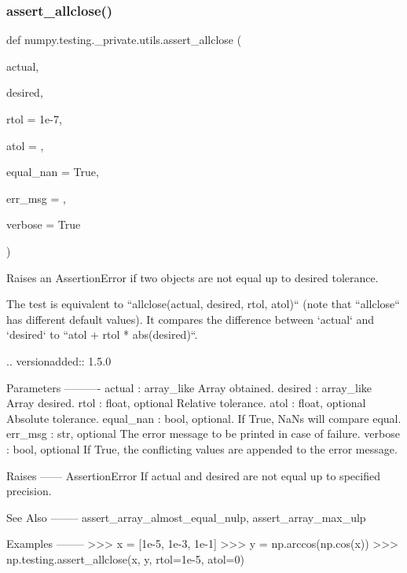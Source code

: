 \subsubsection{\texorpdfstring{assert\+\_\+allclose()}{assert\_allclose()}}
{\footnotesize\ttfamily def numpy.\+testing.\+\_\+private.\+utils.\+assert\+\_\+allclose (\begin{DoxyParamCaption}\item[{}]{actual,  }\item[{}]{desired,  }\item[{}]{rtol = {\ttfamily 1e-\/7},  }\item[{}]{atol = {},  }\item[{}]{equal\+\_\+nan = {\ttfamily True},  }\item[{}]{err\+\_\+msg = {\ttfamily \textquotesingle{}\textquotesingle{}},  }\item[{}]{verbose = {\ttfamily True} }\end{DoxyParamCaption})}

\begin{DoxyVerb}Raises an AssertionError if two objects are not equal up to desired
tolerance.

The test is equivalent to ``allclose(actual, desired, rtol, atol)`` (note
that ``allclose`` has different default values). It compares the difference
between `actual` and `desired` to ``atol + rtol * abs(desired)``.

.. versionadded:: 1.5.0

Parameters
----------
actual : array_like
    Array obtained.
desired : array_like
    Array desired.
rtol : float, optional
    Relative tolerance.
atol : float, optional
    Absolute tolerance.
equal_nan : bool, optional.
    If True, NaNs will compare equal.
err_msg : str, optional
    The error message to be printed in case of failure.
verbose : bool, optional
    If True, the conflicting values are appended to the error message.

Raises
------
AssertionError
    If actual and desired are not equal up to specified precision.

See Also
--------
assert_array_almost_equal_nulp, assert_array_max_ulp

Examples
--------
>>> x = [1e-5, 1e-3, 1e-1]
>>> y = np.arccos(np.cos(x))
>>> np.testing.assert_allclose(x, y, rtol=1e-5, atol=0)\end{DoxyVerb}
 \mbox{\label{namespacenumpy_1_1testing_1_1__private_1_1utils_a867e23ad224abf69d0af1a4685606540}} 
